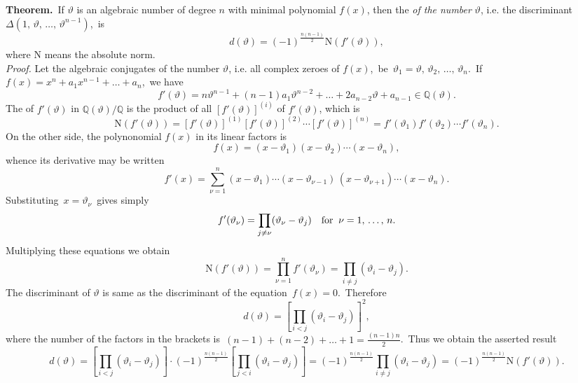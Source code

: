 \documentclass[12pt]{article}
\theoremstyle{definition}
\begin{document}
\textbf{Theorem.}\, If $\vartheta$ is an algebraic number of degree $n$ with minimal polynomial $f(x)$, then the {\em {} of the number} $\vartheta$, i.e. the discriminant $\Delta(1,\,\vartheta,\,\ldots,\,\vartheta^{n-1})$,\, is
$$d(\vartheta) = (-1)^\frac{n(n-1)}{2}\mbox{N}(f'(\vartheta)),$$
where N means the absolute norm.\\

{\em Proof.}  Let the algebraic conjugates of the number $\vartheta$, i.e. all complex zeroes of $f(x)$,\, be\,  $\vartheta_1 = \vartheta,\,\vartheta_2,\,\ldots,\,\vartheta_n$.\, If\, $f(x) = x^n+a_1x^{n-1}+\ldots+a_n$,\, we have 
$$f'(\vartheta) = n\vartheta^{n-1}+(n-1)a_1\vartheta^{n-2}+\ldots+2a_{n-2}\vartheta+a_{n-1} \in \mathbb{Q}(\vartheta).$$
The  of $f'(\vartheta)$ in $\mathbb{Q}(\vartheta)/\mathbb{Q}$ is the product of all 
 $[f'(\vartheta)]^{(i)}$ of $f'(\vartheta)$, which is
$$\mbox{N}(f'(\vartheta)) = 
[f'(\vartheta)]^{(1)}[f'(\vartheta)]^{(2)}\cdots[f'(\vartheta)]^{(n)} = f'(\vartheta_1)f'(\vartheta_2)\cdots f'(\vartheta_n).$$
On the other side, the polynonomial $f(x)$ in its linear factors is 
$$f(x) = (x-\vartheta_1)(x-\vartheta_2)\cdots(x-\vartheta_n),$$
whence its derivative may be written
$$f'(x) = \sum_{\nu=1}^n(x-\vartheta_1)\cdots(x-\vartheta_{\nu-1})\,(x-\vartheta_{\nu+1})\cdots(x-\vartheta_n).$$
Substituting\, $x = \vartheta_\nu$\, gives simply
$$f'(\vartheta_\nu) = \prod_{j\neq\nu}(\vartheta_\nu-\vartheta_j)\quad \mbox{for\;\;} \nu = 1,\,\ldots,\,n.$$
Multiplying these equations we obtain 
$$\mbox{N}(f'(\vartheta)) = \prod_{\nu=1}^nf'(\vartheta_\nu) = \prod_{i\neq j}(\vartheta_i-\vartheta_j).$$
The discriminant of $\vartheta$ is same as the discriminant of the equation \,$f(x) = 0$.\, Therefore
$$d(\vartheta) = \left[\prod_{i<j}(\vartheta_i-\vartheta_j)\right]^2,$$
where the number of the factors in the brackets is\, $(n-1)+(n-2)+\ldots+1 = \frac{(n-1)n}{2}$.\, Thus we obtain the asserted result
$$d(\vartheta) = 
\left[\prod_{i<j}(\vartheta_i-\vartheta_j)\right]\cdot(-1)^\frac{n(n-1)}{2}\left[\prod_{j<i}(\vartheta_i-\vartheta_j)\right] 
= (-1)^\frac{n(n-1)}{2}\prod_{i\neq j}(\vartheta_i-\vartheta_j) = (-1)^\frac{n(n-1)}{2}\mbox{N}(f'(\vartheta)).$$

\end{document}
